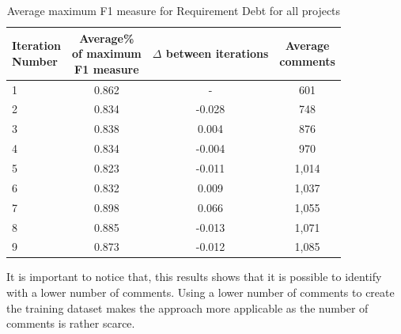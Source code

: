 \begin{table}[!thb]
	\begin{center}
		\caption{Average maximum F1 measure for Requirement Debt for all projects}
		\label{tbl:requirement_iteration_performance}
		\begin{tabular}{l| c c c}
			\toprule
			\thead{Iteration\\Number} & \thead{Average\%\\of maximum\\F1 measure} & \thead{$\Delta$\\between\\iterations} & \thead{Average\\comments} \\
			\midrule
			1  &  0.862 &   -      &  601   \\  
            2  &  0.834 & -0.028   &  748   \\
            3  &  0.838 &  0.004   &  876   \\  
            4  &  0.834 & -0.004   &  970   \\
            5  &  0.823 & -0.011   &  1,014  \\
            6  &  0.832 &  0.009   &  1,037  \\
			7  &  0.898 &  0.066   &  1,055  \\  
            8  &  0.885 & -0.013   &  1,071  \\  
            9  &  0.873 & -0.012   &  1,085  \\  
			\bottomrule
		\end{tabular}
	\end{center}    
\end{table}

It is important to notice that, this results shows that it is possible to identify \SATD with a lower number of comments. Using a lower number of comments to create the training dataset makes the approach more applicable as the number of \SATD comments is rather scarce.    

